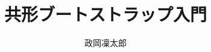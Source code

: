 \documentclass[11pt,titlepage]{ltjsarticle}
\numberwithin{equation}{section}
\begin{document}
\title{共形ブートストラップ入門}
\author{政岡凜太郎}
\maketitle
\tableofcontents
\newpage

\newpage

\newpage

\newpage

\newpage

\newpage

\newpage

\newpage

\newpage

\newpage

\newpage

\newpage
\printbibliography
\end{document}
